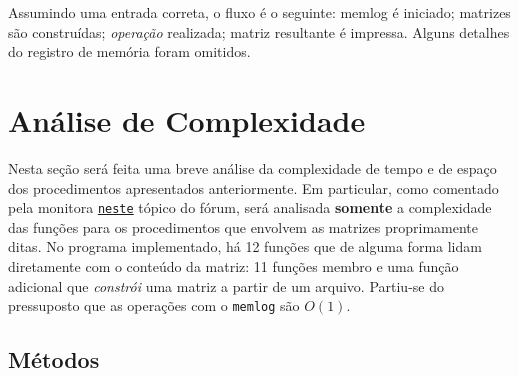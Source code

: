 \documentclass{article}
\def\code#1{\texttt{#1}}
\begin{document}
Assumindo uma entrada correta, o fluxo é o seguinte: memlog é iniciado; matrizes são construídas; \textit{operação}  realizada; matriz resultante é impressa. Alguns detalhes do registro de memória foram omitidos.

\section{Análise de Complexidade}

Nesta seção será feita uma breve análise da complexidade de tempo e de espaço dos procedimentos apresentados anteriormente. Em particular, como comentado pela monitora \href{https://virtual.ufmg.br/20212/mod/forum/discuss.php?d=15959#p33316}{\nolinkurl{neste}} tópico do fórum, será analisada \textbf{somente} a complexidade das funções para os procedimentos que envolvem as matrizes proprimamente ditas. No programa implementado, há 12 funções que de alguma forma lidam diretamente com o conteúdo da matriz: 11 funções membro e uma função adicional que \textit{constrói} uma matriz a partir de um arquivo. Partiu-se do pressuposto que as operações com o \code{memlog} são \( O(1) \).

\subsection{Métodos}
\end{document}
